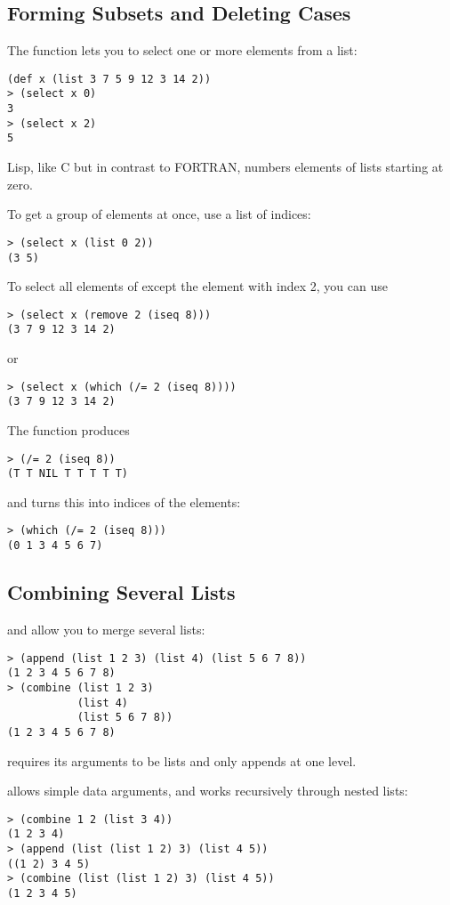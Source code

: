 \begin{slide}{}
\subsection{Forming Subsets and Deleting Cases}
The  function lets you to select one or more elements
from a list:
\begin{verbatim}
(def x (list 3 7 5 9 12 3 14 2))
> (select x 0)
3
> (select x 2)
5
\end{verbatim}
Lisp, like C but in contrast to FORTRAN, numbers
elements of lists starting at zero.

To get a group of elements at once, use a list of indices:
\begin{verbatim}
> (select x (list 0 2))
(3 5)
\end{verbatim}
\end{slide}

\begin{slide}{}
To select all elements of  except the element
with index 2, you can use
\begin{verbatim}
> (select x (remove 2 (iseq 8)))
(3 7 9 12 3 14 2)
\end{verbatim}
or
\begin{verbatim}
> (select x (which (/= 2 (iseq 8))))
(3 7 9 12 3 14 2)
\end{verbatim}
The \dcode{/=} function produces
\begin{verbatim}
> (/= 2 (iseq 8))
(T T NIL T T T T T)
\end{verbatim}
and  turns this into indices of the  elements:
\begin{verbatim}
> (which (/= 2 (iseq 8)))
(0 1 3 4 5 6 7)
\end{verbatim}
\end{slide}

\begin{slide}{}
\subsection{Combining Several Lists}
 and  allow you to merge several lists:
{\Large
\begin{verbatim}
> (append (list 1 2 3) (list 4) (list 5 6 7 8))
(1 2 3 4 5 6 7 8)
> (combine (list 1 2 3)
           (list 4)
           (list 5 6 7 8))
(1 2 3 4 5 6 7 8)
\end{verbatim}}
 requires its arguments to be lists and only appends at
one level.

 allows simple data arguments, and works recursively
through nested lists:
{\Large
\begin{verbatim}
> (combine 1 2 (list 3 4))
(1 2 3 4)
> (append (list (list 1 2) 3) (list 4 5))
((1 2) 3 4 5)
> (combine (list (list 1 2) 3) (list 4 5))
(1 2 3 4 5)
\end{verbatim}}
\end{slide}

